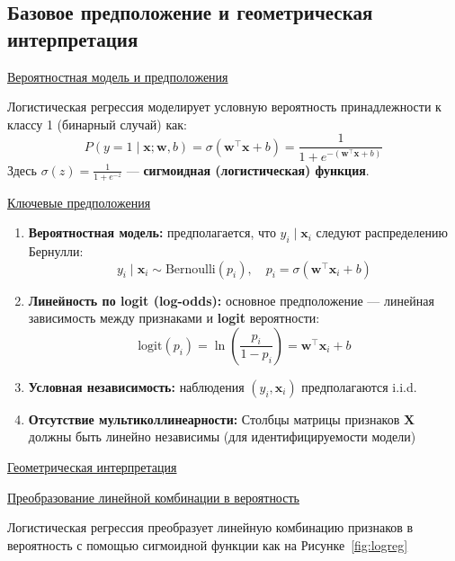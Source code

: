 \subsection{Базовое предположение и геометрическая интерпретация}

\underline{Вероятностная модель и предположения}

\begin{definition}
    Логистическая регрессия моделирует условную вероятность принадлежности к классу 1 (бинарный случай) как:
    \[ P(y = 1 \mid \bm{x}; \bm{w}, b) = \sigma(\bm{w}^\top \bm{x} + b) = \frac{1}{1 + e^{-(\bm{w}^\top \bm{x} + b)}} \]
    Здесь $\sigma(z) = \frac{1}{1+e^{-z}}$ --- \textbf{сигмоидная (логистическая) функция}.
\end{definition}

\underline{Ключевые предположения}

\begin{enumerate}
    \item \textbf{Вероятностная модель:} предполагается, что $y_i \mid \bm{x}_i$ следуют распределению Бернулли:
    \[ y_i \mid \bm{x}_i \sim \text{Bernoulli}(p_i), \quad p_i = \sigma(\bm{w}^\top \bm{x}_i + b) \]
    
    \item \textbf{Линейность по logit (log-odds):} основное предположение --- линейная зависимость между признаками
    и \textbf{logit} вероятности:
    \[ \text{logit}(p_i) = \ln\left(\frac{p_i}{1-p_i}\right) = \bm{w}^\top \bm{x}_i + b \]
    
    \item \textbf{Условная независимость:} наблюдения $(y_i, \bm{x}_i)$ предполагаются i.i.d.
    \item \textbf{Отсутствие мультиколлинеарности:} Столбцы матрицы признаков $\bm{X}$ должны быть линейно
    независимы (для идентифицируемости модели)
\end{enumerate}

\underline{Геометрическая интерпретация}

\underline{Преобразование линейной комбинации в вероятность}

Логистическая регрессия преобразует линейную комбинацию признаков в вероятность с помощью сигмоидной функции как на
Рисунке~\ref{fig:logreg}


